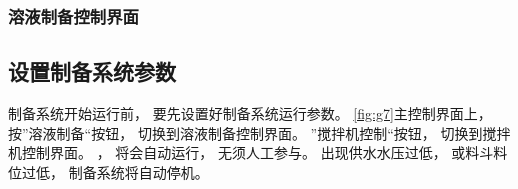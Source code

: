 \documentclass[UTF8,a4paper,12pt,titlepage]{ctexart}
\begin{document}
         \subsubsection{溶液制备控制界面}
   \subsection{设置制备系统参数}\label{sec:sg5}
      制备系统开始运行前，
      要先设置好制备系统运行参数。
      \ref{fig:g7}主控制界面上，
      按”溶液制备“按钮，
      切换到溶液制备控制界面。
      ”搅拌机控制“按钮，
      切换到搅拌机控制界面。
      ，
      将会自动运行，
      无须人工参与。
      出现供水水压过低，
      或料斗料位过低，
      制备系统将自动停机。

      \newpage
\end{document}
